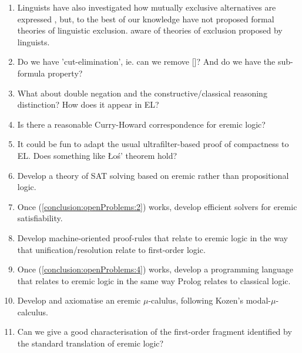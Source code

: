 \begin{enumerate}

\item Linguists have also investigated how mutually exclusive
  alternatives are expressed \cite[Chapter ??? See John's email]{OKeeffeA:rouhanocl}, but, to the best of our knowledge  have not proposed
  formal theories of linguistic exclusion.
  aware of theories of exclusion proposed by linguists.

\item Do we have 'cut-elimination', ie. can we remove
  []?  And do we have the sub-formula property?

\item What about double negation and the constructive/classical
  reasoning distinction?  How does it appear in EL?

\item Is there a reasonable Curry-Howard correspondence for eremic
  logic?

\item It could be fun to adapt the usual ultrafilter-based proof of compactness 
  to EL. Does something like \L{}o\'{s}' theorem hold?

\item\label{conclusion:openProblems:2}  Develop a theory of SAT solving based on eremic rather than
  propositional logic.

\item Once (\ref{conclusion:openProblems:2}) works, develop efficient
  solvers for eremic satisfiability.

\item\label{conclusion:openProblems:4} Develop machine-oriented proof-rules that relate to eremic logic
  in the way that unification/resolution relate to first-order logic.

\item Once (\ref{conclusion:openProblems:4}) works, develop a
  programming language that relates to eremic logic in the same way
  Prolog relates to classical logic.

\item Develop and axiomatise an eremic $\mu$-calulus, following
  Kozen's modal-$\mu$-calculus.

\item Can we give a good characterisation of the first-order fragment
  identified by the standard translation of eremic logic?

\end{enumerate}

